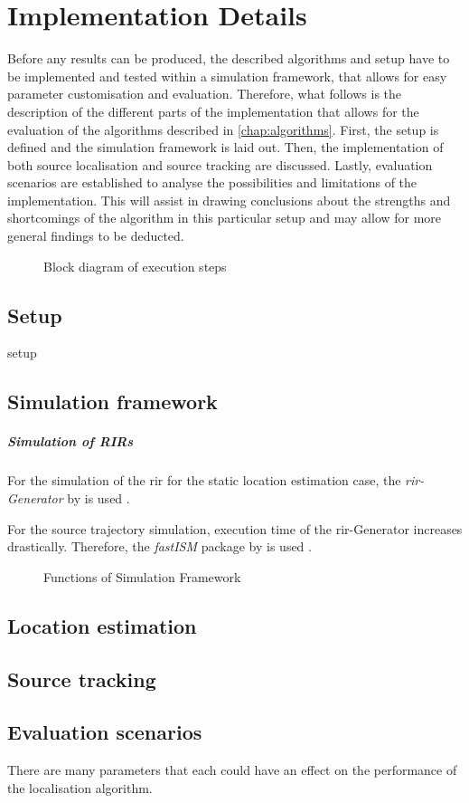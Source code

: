 \chapter{Implementation Details}
\label{chap:implementation}
Before any results can be produced, the described algorithms and setup have to be implemented and tested within a simulation framework, that allows for easy parameter customisation and evaluation. Therefore, what follows is the description of the different parts of the implementation that allows for the evaluation of the algorithms described in \ref{chap:algorithms}. First, the setup is defined and the simulation framework is laid out. Then, the implementation of both source localisation and source tracking are discussed. Lastly, evaluation scenarios are established to analyse the possibilities and limitations of the implementation. This will assist in drawing conclusions about the strengths and shortcomings of the algorithm in this particular setup and may allow for more general findings to be deducted.

\begin{figure}[H]
	\centering
	
	\caption{Block diagram of execution steps}
	\label{diag:execBlocks}
\end{figure}


\section{Setup}
\label{sec:setup}
{setup}

\section{Simulation framework}


\paragraph{Simulation of RIRs}
For the simulation of the \gls{rir} for the static location estimation case, the \emph{\gls{rir}-Generator} by \citeauthor{Habets2014} is used \cite{Habets2014}.

For the source trajectory simulation, execution time of the \gls{rir}-Generator increases drastically. Therefore, the \emph{fastISM} package by \citeauthor{Lehmann2010} is used \cite{Lehmann2010}.
\begin{figure}[H]
	\centering
	
	\caption{Functions of Simulation Framework}
	\label{diag:simulationFramework}
\end{figure}

%

\section{Location estimation}
\section{Source tracking}
\section{Evaluation scenarios}
There are many parameters that each could have an effect on the performance of the localisation algorithm.


